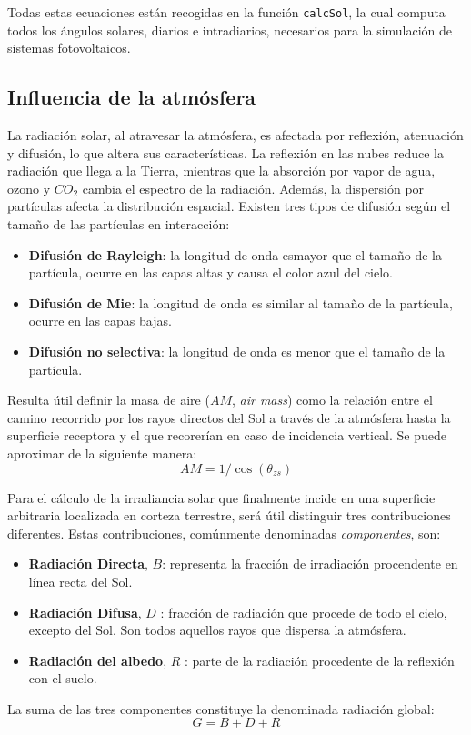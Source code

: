 Todas estas ecuaciones están recogidas en la función \texttt{calcSol}, la cual computa todos los ángulos solares, diarios e intradiarios, necesarios para la simulación de sistemas fotovoltaicos.

\subsection{Influencia de la atmósfera}
\label{sec:org1c21f49}
La radiación solar, al atravesar la atmósfera, es afectada por reflexión, atenuación y difusión, lo que altera sus características. La reflexión en las nubes reduce la radiación que llega a la Tierra, mientras que la absorción por vapor de agua, ozono y \(CO_2\) cambia el espectro de la radiación. Además, la dispersión por partículas afecta la distribución espacial. Existen tres tipos de difusión según el tamaño de las partículas en interacción:
\begin{itemize}
\item \textbf{Difusión de Rayleigh}: la longitud de onda esmayor que el tamaño de la partícula, ocurre en las capas altas y causa el color azul del cielo.
\item \textbf{Difusión de Mie}: la longitud de onda es similar al tamaño de la partícula, ocurre en las capas bajas.
\item \textbf{Difusión no selectiva}: la longitud de onda es menor que el tamaño de la partícula.
\end{itemize}

Resulta útil definir la masa de aire (\(AM\), \emph{air mass}) como la relación entre el camino recorrido por los rayos directos del Sol a través de la atmósfera hasta la superficie receptora y el que recorerían en caso de incidencia vertical. Se puede aproximar de la siguiente manera: 
\begin{equation}
AM = 1/\cos(\theta_{zs})
\end{equation}

Para el cálculo de la irradiancia solar que finalmente incide en una superficie arbitraria localizada en corteza terrestre, será útil distinguir tres contribuciones diferentes. Estas contribuciones, comúnmente denominadas \emph{componentes}, son:
\begin{itemize}
\item \textbf{Radiación Directa}, \(B\): representa la fracción de irradiación procendente en línea recta del Sol. 
\item \textbf{Radiación Difusa}, \(D\) : fracción de radiación que procede de todo el cielo, excepto del Sol. Son todos aquellos rayos que dispersa la atmósfera.
\item \textbf{Radiación del albedo}, \(R\) : parte de la radiación procedente de la reflexión con el suelo.
\end{itemize}
La suma de las tres componentes constituye la denominada radiación global: 
\begin{equation}
G = B + D + R
\label{eq:comp_rad}
\end{equation}


